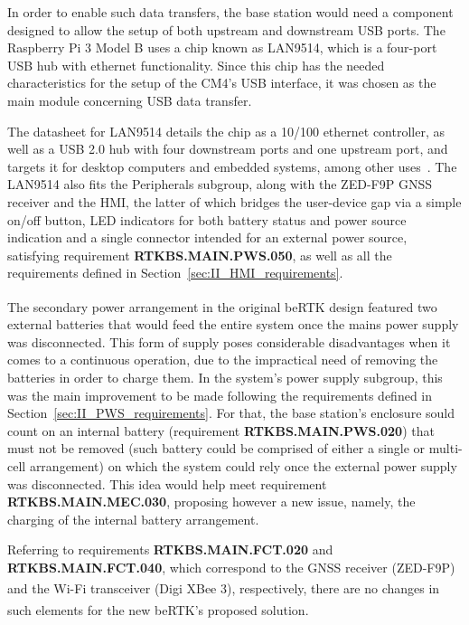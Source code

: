 
In order to enable such data transfers, the base station would need a component designed to allow the setup of both upstream and downstream USB ports. The Raspberry Pi 3 Model B uses a chip known as LAN9514, which is a four-port USB hub with ethernet functionality. Since this chip has the needed characteristics for the setup of the CM4's USB interface, it was chosen as the main module concerning USB data transfer.

The datasheet for LAN9514 details the chip as a 10/100 ethernet controller, as well as a USB 2.0 hub with four downstream ports and one upstream port, and targets it for desktop computers and embedded systems, among other uses~\cite{LAN9514}. The LAN9514 also fits the Peripherals subgroup, along with the ZED-F9P GNSS receiver and the HMI, the latter of which bridges the user-device gap via a simple on/off button, LED indicators for both battery status and power source indication and a single connector intended for an external power source, satisfying requirement \textbf{RTKBS.MAIN.PWS.050}, as well as all the requirements defined in Section~\ref{sec:II_HMI_requirements}.

The secondary power arrangement in the original beRTK\textsuperscript{\textregistered} design featured two external batteries that would feed the entire system once the mains power supply was disconnected. This form of supply poses considerable disadvantages when it comes to a continuous operation, due to the impractical need of removing the batteries in order to charge them. In the system's power supply subgroup, this was the main improvement to be made following the requirements defined in Section~\ref{sec:II_PWS_requirements}. For that, the base station's enclosure sould count on an internal battery (requirement \textbf{RTKBS.MAIN.PWS.020}) that must not be removed (such battery could be comprised of either a single or multi-cell arrangement) on which the system could rely once the external power supply was disconnected. This idea would help meet requirement \textbf{RTKBS.MAIN.MEC.030}, proposing however a new issue, namely, the charging of the internal battery arrangement.

Referring to requirements \textbf{RTKBS.MAIN.FCT.020} and \textbf{RTKBS.MAIN.FCT.040}, which correspond to the GNSS receiver (ZED-F9P) and the Wi-Fi transceiver (Digi XBee\textsuperscript{\textregistered} 3), respectively, there are no changes in such elements for the new beRTK\textsuperscript{\textregistered}'s proposed solution.

